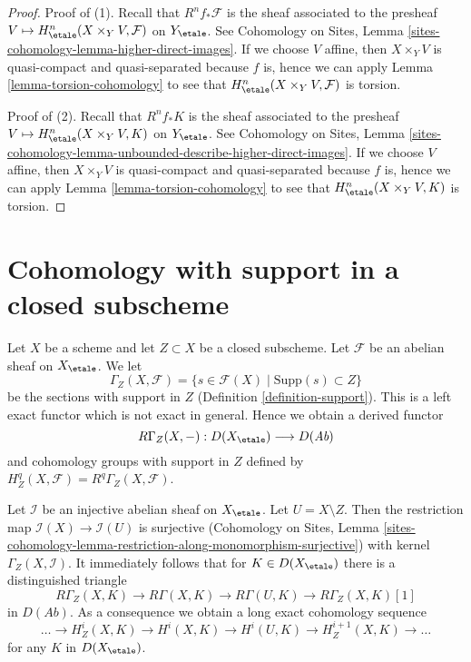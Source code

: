 \begin{proof}
Proof of (1). Recall that $R^nf_*\mathcal{F}$ is the sheaf associated
to the presheaf $V \mapsto H^n_\etale(X \times_Y V, \mathcal{F})$
on $Y_\etale$. See Cohomology on Sites,
Lemma \ref{sites-cohomology-lemma-higher-direct-images}.
If we choose $V$ affine, then $X \times_Y V$ is
quasi-compact and quasi-separated because $f$ is, hence
we can apply Lemma \ref{lemma-torsion-cohomology} to see that
$H^n_\etale(X \times_Y V, \mathcal{F})$ is torsion.

\medskip\noindent
Proof of (2). Recall that $R^nf_*K$ is the sheaf associated
to the presheaf $V \mapsto H^n_\etale(X \times_Y V, K)$
on $Y_\etale$. See Cohomology on Sites,
Lemma \ref{sites-cohomology-lemma-unbounded-describe-higher-direct-images}.
If we choose $V$ affine, then $X \times_Y V$ is
quasi-compact and quasi-separated because $f$ is, hence
we can apply Lemma \ref{lemma-torsion-cohomology} to see that
$H^n_\etale(X \times_Y V, K)$ is torsion.
\end{proof}









\section{Cohomology with support in a closed subscheme}
\label{section-cohomology-support}

\noindent
Let $X$ be a scheme and let $Z \subset X$ be a closed subscheme.
Let $\mathcal{F}$ be an abelian sheaf on $X_\etale$. We let
$$
\Gamma_Z(X, \mathcal{F}) =
\{s \in \mathcal{F}(X) \mid \text{Supp}(s) \subset Z\}
$$
be the sections with support in $Z$ (Definition \ref{definition-support}).
This is a left exact functor which is not exact in general.
Hence we obtain a derived functor
$$
R\Gamma_Z(X, -) : D(X_\etale) \longrightarrow D(\textit{Ab})
$$
and cohomology groups with support in $Z$ defined by
$H^q_Z(X, \mathcal{F}) = R^q\Gamma_Z(X, \mathcal{F})$.

\medskip\noindent
Let $\mathcal{I}$ be an injective abelian sheaf on $X_\etale$.
Let $U = X \setminus Z$.
Then the restriction map $\mathcal{I}(X) \to \mathcal{I}(U)$ is surjective
(Cohomology on Sites, Lemma
\ref{sites-cohomology-lemma-restriction-along-monomorphism-surjective})
with kernel $\Gamma_Z(X, \mathcal{I})$. It immediately follows that
for $K \in D(X_\etale)$ there is a distinguished triangle
$$
R\Gamma_Z(X, K) \to R\Gamma(X, K) \to R\Gamma(U, K) \to R\Gamma_Z(X, K)[1]
$$
in $D(\textit{Ab})$. As a consequence we obtain a long exact cohomology
sequence
$$
\ldots \to H^i_Z(X, K) \to H^i(X, K) \to H^i(U, K) \to
H^{i + 1}_Z(X, K) \to \ldots
$$
for any $K$ in $D(X_\etale)$.


